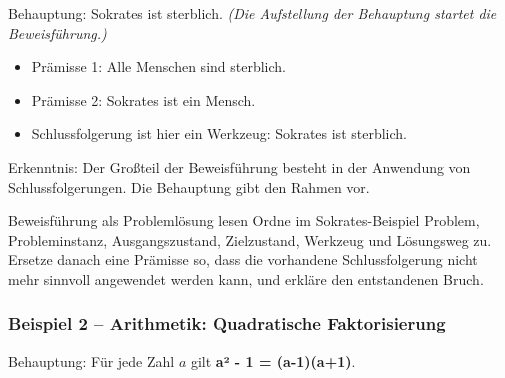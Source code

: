 \documentclass{article}
\begin{document}
        Behauptung: Sokrates ist sterblich. \emph{(Die Aufstellung der Behauptung startet die Beweisführung.)}
      

      \begin{itemize}
        \item Prämisse 1: Alle Menschen sind sterblich.

        \item Prämisse 2: Sokrates ist ein Mensch.

        \item Schlussfolgerung ist hier ein Werkzeug: Sokrates ist sterblich.

      \end{itemize}
      

        Erkenntnis: Der Großteil der Beweisführung besteht in der Anwendung von Schlussfolgerungen. Die Behauptung gibt den Rahmen vor.

      \begin{uebung}{Beweisführung als Problemlösung lesen}
      Ordne im Sokrates-Beispiel Problem, Probleminstanz, Ausgangszustand, Zielzustand, Werkzeug und Lösungsweg zu. Ersetze danach eine Prämisse so, dass die vorhandene Schlussfolgerung nicht mehr sinnvoll angewendet werden kann, und erkläre den entstandenen Bruch.
      \end{uebung}
      


      \subsubsection{Beispiel 2 – Arithmetik: Quadratische Faktorisierung}
      

        Behauptung: Für jede Zahl \(a\) gilt \textbf{a² - 1 = (a-1)(a+1)}.
      
\end{document}

